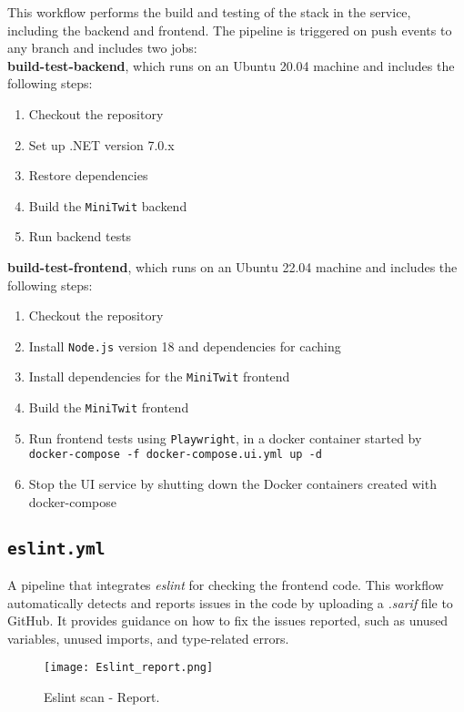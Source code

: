 This workflow performs the build and testing of the stack in the service, including the backend and frontend. The pipeline is triggered on push events to any branch and includes two jobs: \\

\textbf{build-test-backend}, which runs on an Ubuntu 20.04 machine and includes the following steps:

\begin{enumerate}
    \item Checkout the repository
    \item Set up .NET version 7.0.x
    \item Restore dependencies
    \item Build the \texttt{MiniTwit} backend
    \item Run backend tests
\end{enumerate}

\textbf{build-test-frontend}, which runs on an Ubuntu 22.04 machine and includes the following steps:

\begin{enumerate}
    \item Checkout the repository
    \item Install \texttt{Node.js} version 18 and dependencies for caching
    \item Install dependencies for the \texttt{MiniTwit} frontend
    \item Build the \texttt{MiniTwit} frontend
    \item Run frontend tests using \texttt{Playwright}, in a docker container started by \texttt{docker-compose -f docker-compose.ui.yml up -d}
    \item Stop the UI service by shutting down the Docker containers created with docker-compose
\end{enumerate}

\subsection{\texttt{eslint.yml}}

A pipeline that integrates \textit{eslint} for checking the frontend code. This workflow automatically detects and reports issues in the code by uploading a \textit{.sarif} file to GitHub. It provides guidance on how to fix the issues reported, such as unused variables, unused imports, and type-related errors. 

\begin{figure}[H]
    \centering
    \texttt{[image: Eslint\_report.png]}
    \caption{Eslint scan - Report.}
    \label{fig:elsint_report}
\end{figure}

